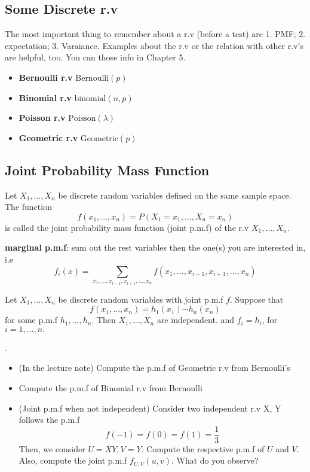 \subsection{Some Discrete r.v}
The most important thing to remember about a r.v (before a test) are 1. PMF; 2. expectation; 3. Varaiance. Examples about the r.v or the relation with other r.v's are helpful, too. You can those info in \cite{Gravner2021} Chapter 5.\\
\begin{itemize}
    \item \textbf{Bernoulli r.v} \(\text{Bernoulli}(p) \)  
    \item \textbf{Binomial r.v} \(\text{binomial}(n,p) \)   

    \item \textbf{Poisson r.v} \(\text{Poisson}(\lambda )\) 
       
    \item \textbf{Geometric r.v} \(\text{Geometric}(p) \)  
\end{itemize}

\subsection{Joint Probability Mass Function}
Let \(X_1, \dots , X_n\) be discrete random variables defined on the same sample space. The function
\[
    f(x_1, \dots, x_n) = P(X_1= x_1,\dots, X_n = x_n )
\]
is called the joint probability mass function (joint p.m.f) of the r.v \(X_1, \dots, X_n\).

\textbf{marginal p.m.f}: 
sum out the rest variables then the one(s) you are interested in, i.e
\[
    f_i(x) = \sum_{x_1,\dots, x_{i-1},x_{i+1},\dots,x_n} f(x_1,\dots, x_{i-1},x_{i+1},\dots,x_n) 
\]

\begin{theorem*}
    Let \(X_1,\dots, X_n\) be discrete random variables with joint p.m.f \(f\). Suppose that 
    \[
        f(x_1, \dots, x_n) = h_1(x_1)\cdots h_n(x_n)
    \] 
    for some p.m.f \(h_1,\dots, h_n\). Then \(X_1,\dots, X_n\) are independent. and \(f_i = h_i\), for \(i = 1,\dots, n.\)    
\end{theorem*}

\begin{eg}[Joint p.m.f]
    .\\
    \begin{itemize}
        \item (In the lecture note) Compute the p.m.f of Geometric r.v from Bernoulli's
        \item Compute the p.m.f of Binomial r.v from Bernoulli 
        \item (Joint p.m.f when not independent) Consider two independent r.v X, Y follows the p.m.f
        \[
            f(-1) = f(0) = f(1) = \frac{1}{3}
        \]
        Then, we consider \(U = XY, V = Y\). Compute the respective p.m.f of \(U\) and \(V\). Also, compute the joint p.m.f \(f_{U,V}(u,v)\). What do you observe?    
    \end{itemize}
\end{eg}


